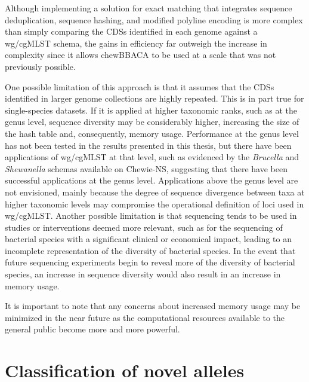 Although implementing a solution for exact matching that integrates sequence deduplication, sequence hashing, and modified polyline encoding is more complex than simply comparing the CDSs identified in each genome against a \ac{wg/cgMLST} schema, the gains in efficiency far outweigh the increase in complexity since it allows chewBBACA to be used at a scale that was not previously possible.

One possible limitation of this approach is that it assumes that the CDSs identified in larger genome collections are highly repeated. This is in part true for single-species datasets. If it is applied at higher taxonomic ranks, such as at the genus level, sequence diversity may be considerably higher, increasing the size of the hash table and, consequently, memory usage. Performance at the genus level has not been tested in the results presented in this thesis, but there have been applications of wg/cgMLST at that level, such as evidenced by the \textit{Brucella} and \textit{Shewanella} schemas available on Chewie-NS, suggesting that there have been successful applications at the genus level. Applications above the genus level are not envisioned, mainly because the degree of sequence divergence between taxa at higher taxonomic levels may compromise the operational definition of loci used in wg/cgMLST. Another possible limitation is that sequencing tends to be used in studies or interventions deemed more relevant, such as for the sequencing of bacterial species with a significant clinical or economical impact, leading to an incomplete representation of the diversity of bacterial species. In the event that future sequencing experiments begin to reveal more of the diversity of bacterial species, an increase in sequence diversity would also result in an increase in memory usage.

It is important to note that any concerns about increased memory usage may be minimized in the near future as the computational resources available to the general public become more and more powerful.

\section{Classification of novel alleles}

